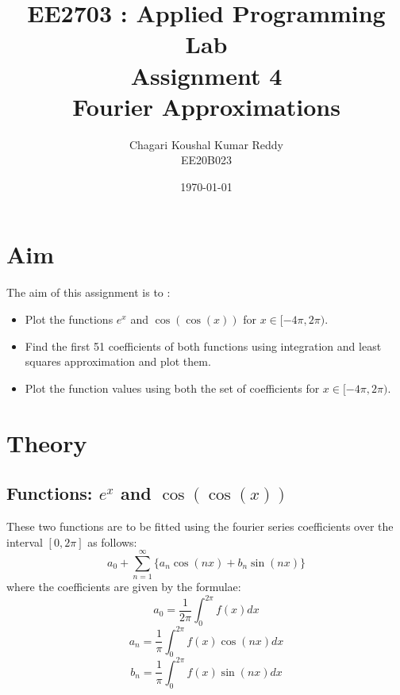 \documentclass[12pt, a4paper]{article}
\title{\textbf{EE2703 : Applied Programming Lab \\ Assignment 4 \\ Fourier Approximations}}
\author{Chagari Koushal Kumar Reddy \\ EE20B023} %
\date{\today} %
\begin{document}
		

\maketitle %
\clearpage

\tableofcontents
\clearpage

\section{Aim}
The aim of this assignment is to :
\begin{itemize}
    \item Plot the functions $e^{x}$ and $\cos(\cos(x))$ for $x \in [-4\pi ,2\pi )$.
    \item Find the first 51 coefficients of both functions using integration and least squares approximation and plot them.
    \item Plot the function values using both the set of coefficients for $x \in [-4\pi ,2\pi )$.
\end{itemize}

\section{Theory}
\subsection{Functions: $e^{x}$ and $\cos(\cos(x))$}
These two functions are to be fitted using the fourier series coefficients over the interval $[0,2\pi ]$ as follows:
    \begin{equation*}
    a_{0}+\sum\limits_{n=1}^{\infty}  \{a_{n}\cos (nx)+b_{n}\sin (nx)\}
    \end{equation*}
where the coefficients are given by the formulae:
    \begin{equation*}
    a_{0} = \frac{1}{2\pi } \int_{0}^{2\pi } f(x)dx
    \end{equation*}
    \begin{equation*}
    a_{n} = \frac{1}{\pi } \int_{0}^{2\pi } f(x)\cos(nx)dx
    \end{equation*}
    \begin{equation*}
    b_{n} = \frac{1}{\pi } \int_{0}^{2\pi } f(x)\sin(nx)dx
    \end{equation*}
\end{document}
